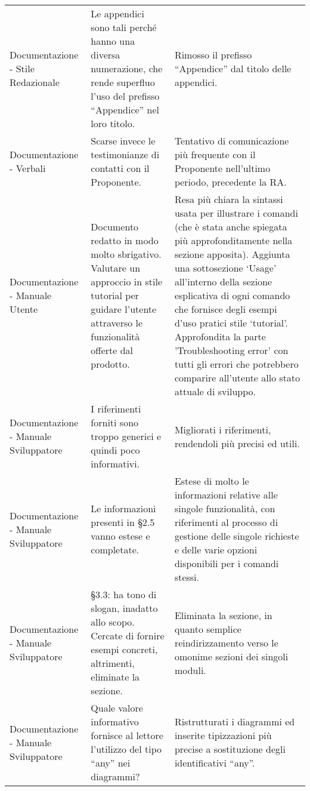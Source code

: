 \begin{longtable}{ 
					>{\centering}p{} 
					>{\centering}p{}
					>{\centering\arraybackslash}p{}}
				
				Documentazione - Stile Redazionale
				&
				Le appendici sono tali perché hanno una diversa numerazione, che rende superfluo l’uso del prefisso “Appendice” nel loro titolo.
				&
				Rimosso il prefisso “Appendice” dal titolo delle appendici.
				\\
				
				
				Documentazione - Verbali
				&
				Scarse invece le testimonianze di contatti con il Proponente\ped{\textit{G}}. 
				&
				Tentativo di comunicazione più frequente con il Proponente\ped{\textit{G}} nell’ultimo periodo, precedente la RA.
				\\
				
				
				Documentazione - Manuale Utente
				&
				Documento redatto in modo molto sbrigativo. Valutare un approccio in stile tutorial per guidare l’utente attraverso le funzionalità offerte dal prodotto\ped{\textit{G}}. 
				&
				Resa più chiara la sintassi usata per illustrare i comandi (che è stata anche spiegata più approfonditamente nella sezione apposita).
				Aggiunta una sottosezione ‘Usage’ all’interno della sezione esplicativa di ogni comando che fornisce degli esempi d’uso pratici stile ‘tutorial’.
				Approfondita la parte 'Troubleshooting error' con tutti gli errori che potrebbero comparire all’utente allo stato attuale di sviluppo.\\
				
				
				Documentazione - Manuale Sviluppatore
				&
				I riferimenti forniti sono troppo generici e quindi poco informativi.
				&
				Migliorati i riferimenti, rendendoli più precisi ed utili.
				\\
				
				
				Documentazione - Manuale Sviluppatore
				&
				Le informazioni presenti in §2.5 vanno estese e completate.
				&
				Estese di molto le informazioni relative alle singole funzionalità, con riferimenti al processo di gestione delle singole richieste e delle varie opzioni disponibili per i comandi stessi. 
				\\
				
				
				Documentazione - Manuale Sviluppatore
				&
				§3.3: ha tono di slogan, inadatto allo scopo. Cercate di fornire esempi concreti, altrimenti, eliminate la sezione.
				&
				Eliminata la sezione, in quanto semplice reindirizzamento verso le omonime sezioni dei singoli moduli\ped{\textit{G}}. 
				\\
				
				
				Documentazione - Manuale Sviluppatore
				&
				Quale valore informativo fornisce al lettore l’utilizzo del tipo “any” nei diagrammi? 
				&
				Ristrutturati i diagrammi ed inserite tipizzazioni più precise a sostituzione degli identificativi “any”.
				\\
				

\end{longtable}
